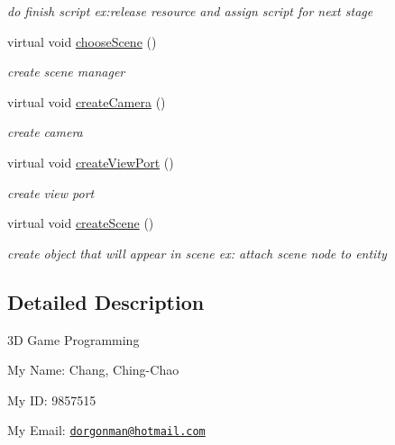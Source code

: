 \begin{DoxyCompactItemize}
\begin{DoxyCompactList}\small\item\em do finish script ex:release resource and assign script for next stage \end{DoxyCompactList}\item 
\hypertarget{class_stage4_aede4ef8ac537035df162a71d42b29a7b}{
virtual void \hyperlink{class_stage4_aede4ef8ac537035df162a71d42b29a7b}{chooseScene} ()}
\label{class_stage4_aede4ef8ac537035df162a71d42b29a7b}

\begin{DoxyCompactList}\small\item\em create scene manager \end{DoxyCompactList}\item 
\hypertarget{class_stage4_a2da44652b3108358b084b51dbe02cdcc}{
virtual void \hyperlink{class_stage4_a2da44652b3108358b084b51dbe02cdcc}{createCamera} ()}
\label{class_stage4_a2da44652b3108358b084b51dbe02cdcc}

\begin{DoxyCompactList}\small\item\em create camera \end{DoxyCompactList}\item 
\hypertarget{class_stage4_abd7410b7d0ac99fbc99b6491a2e1f066}{
virtual void \hyperlink{class_stage4_abd7410b7d0ac99fbc99b6491a2e1f066}{createViewPort} ()}
\label{class_stage4_abd7410b7d0ac99fbc99b6491a2e1f066}

\begin{DoxyCompactList}\small\item\em create view port \end{DoxyCompactList}\item 
\hypertarget{class_stage4_a5b951f6748cecbdb8ae88e5446458d70}{
virtual void \hyperlink{class_stage4_a5b951f6748cecbdb8ae88e5446458d70}{createScene} ()}
\label{class_stage4_a5b951f6748cecbdb8ae88e5446458d70}

\begin{DoxyCompactList}\small\item\em create object that will appear in scene ex: attach scene node to entity \end{DoxyCompactList}\end{DoxyCompactItemize}


\subsection{Detailed Description}
3D Game Programming\par
 My Name: Chang, Ching-\/Chao\par
 My ID: 9857515\par
 My Email: \href{mailto:dorgonman@hotmail.com}{\tt dorgonman@hotmail.com} 

